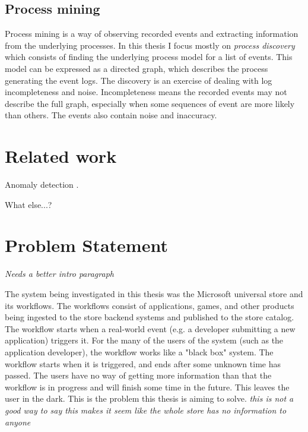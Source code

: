 \documentclass[english,12pt,a4paper,pdftex,sci,utf8]{aaltothesis}
\newcommand{\nyi}[1]{\colorbox{nyibg}{\textcolor{nyitext}{\emph{#1}}}}
\begin{document}
\subsection{Process mining}


Process mining is a way of observing recorded events and extracting information from the underlying processes.
In this thesis I focus mostly on \emph{process discovery} which consists of finding the underlying process model for a list of events. 
This model can be expressed as a directed graph, which describes the process generating the event logs. 
The discovery is an exercise of dealing with log incompleteness and noise.
Incompleteness means the recorded events may not describe the full graph, especially when some 
sequences of event are more likely than others. 
The events also contain noise and inaccuracy. \cite{van2013discovering}





\clearpage
\section{Related work}
\label{sec:relatedwork}

Anomaly detection \cite{bezerra2009anomaly}.

What else...?


\clearpage
\section{Problem Statement}
\label{sec:problem}

\nyi{Needs a better intro paragraph}

The system being investigated in this thesis was the Microsoft universal store and its workflows. 
The workflows consist of applications, games, and other products being ingested to the store backend systems and published to the store catalog.
The workflow starts when a real-world event (e.g. a developer submitting a new application) triggers it.
For the many of the users of the system (such as the application developer), the workflow works 
like a "black box" system. The workflow starts when it is triggered, and ends after some unknown time has passed.
The users have no way of getting more information than that the workflow is in progress and will finish some time 
in the future. This leaves the user in the dark. This is the problem this thesis is aiming to solve. 
\nyi{this is not a good way to say this}
\nyi{makes it seem like the whole store has no information to anyone}
\end{document}
